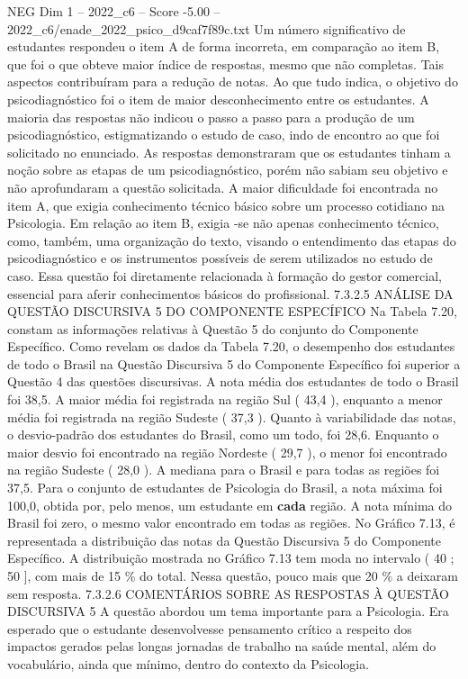 \begin{textsample}{NEG Dim 1 – 2022\_c6 – Score -5.00 – 2022\_c6/enade\_2022\_psico\_d9caf7f89c.txt}
Um número significativo de estudantes respondeu o item A de forma incorreta, em comparação ao item B, que foi o que obteve maior índice de respostas, mesmo que não completas.
Tais aspectos contribuíram para a redução de notas.
Ao que tudo indica, o objetivo do psicodiagnóstico foi o item de maior desconhecimento entre os estudantes.
A maioria das respostas não indicou o passo a passo para a produção de um psicodiagnóstico, estigmatizando o estudo de caso, indo de encontro ao que foi solicitado no enunciado.
As respostas demonstraram que os estudantes tinham a noção sobre as etapas de um psicodiagnóstico, porém não sabiam seu objetivo e não aprofundaram a questão solicitada.
A maior dificuldade foi encontrada no item A, que exigia conhecimento técnico básico sobre um processo cotidiano na Psicologia.
Em relação ao item B, exigia -se não apenas conhecimento técnico, como, também, uma organização do texto, visando o entendimento das etapas do psicodiagnóstico e os instrumentos possíveis de serem utilizados no estudo de caso.
Essa questão foi diretamente relacionada à formação do gestor comercial, essencial para aferir conhecimentos básicos do profissional. 7.3.2.5 ANÁLISE DA QUESTÃO DISCURSIVA 5 DO COMPONENTE ESPECÍFICO Na Tabela 7.20, constam as informações relativas à Questão 5 do conjunto do Componente Específico.
Como revelam os dados da Tabela 7.20, o desempenho dos estudantes de todo o Brasil na Questão Discursiva 5 do Componente Específico foi superior a Questão 4 das questões discursivas.
A nota média dos estudantes de todo o Brasil foi 38,5.
A maior média foi registrada na região Sul ( 43,4 ), enquanto a menor média foi registrada na região Sudeste ( 37,3 ).
Quanto à variabilidade das notas, o desvio-padrão dos estudantes do Brasil, como um todo, foi 28,6.
Enquanto o maior desvio foi encontrado na região Nordeste ( 29,7 ), o menor foi encontrado na região Sudeste ( 28,0 ).
A mediana para o Brasil e para todas as regiões foi 37,5.
Para o conjunto de estudantes de Psicologia do Brasil, a nota máxima foi 100,0, obtida por, pelo menos, um estudante em \textbf{cada} região.
A nota mínima do Brasil foi zero, o mesmo valor encontrado em todas as regiões.
No Gráfico 7.13, é representada a distribuição das notas da Questão Discursiva 5 do Componente Específico.
A distribuição mostrada no Gráfico 7.13 tem moda no intervalo ( 40 ; 50 ], com mais de 15 \% do total.
Nessa questão, pouco mais que 20 \% a deixaram sem resposta. 7.3.2.6 COMENTÁRIOS SOBRE AS RESPOSTAS À QUESTÃO DISCURSIVA 5 A questão abordou um tema importante para a Psicologia.
Era esperado que o estudante desenvolvesse pensamento crítico a respeito dos impactos gerados pelas longas jornadas de trabalho na saúde mental, além do vocabulário, ainda que mínimo, dentro do contexto da Psicologia.

\end{textsample}
